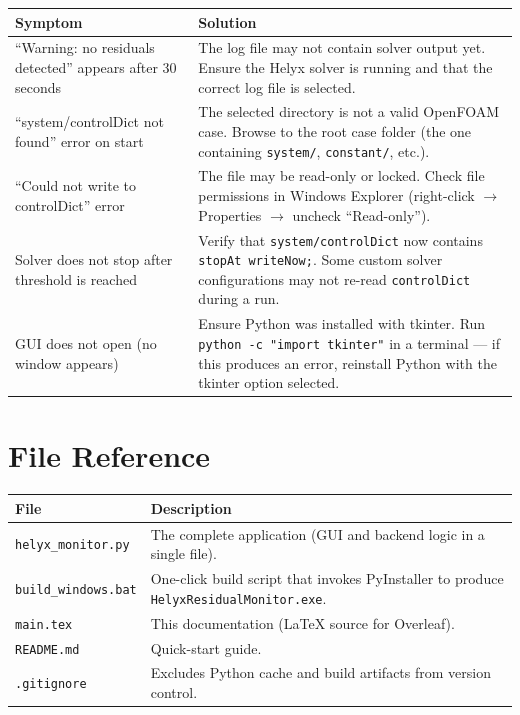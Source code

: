 \documentclass[12pt]{article}
\begin{document}
\begin{table}[h]
\centering
\begin{tabular}{@{}p{5.5cm}p{8.5cm}@{}}
\toprule
\textbf{Symptom} & \textbf{Solution} \\
\midrule
``Warning: no residuals detected'' appears after 30 seconds &
The log file may not contain solver output yet. Ensure the Helyx solver is running and that the correct log file is selected. \\
\addlinespace
``system/controlDict not found'' error on start &
The selected directory is not a valid OpenFOAM case. Browse to the root case folder (the one containing \texttt{system/}, \texttt{constant/}, etc.). \\
\addlinespace
``Could not write to controlDict'' error &
The file may be read-only or locked. Check file permissions in Windows Explorer (right-click $\to$ Properties $\to$ uncheck ``Read-only''). \\
\addlinespace
Solver does not stop after threshold is reached &
Verify that \texttt{system/controlDict} now contains \texttt{stopAt writeNow;}. Some custom solver configurations may not re-read \texttt{controlDict} during a run. \\
\addlinespace
GUI does not open (no window appears) &
Ensure Python was installed with tkinter. Run \texttt{python -c "import tkinter"} in a terminal --- if this produces an error, reinstall Python with the tkinter option selected. \\
\bottomrule
\end{tabular}
\end{table}

\section{File Reference}

\begin{table}[h]
\centering
\begin{tabular}{@{}lp{9cm}@{}}
\toprule
\textbf{File} & \textbf{Description} \\
\midrule
\texttt{helyx\_monitor.py} & The complete application (GUI and backend logic in a single file). \\
\texttt{build\_windows.bat} & One-click build script that invokes PyInstaller to produce \texttt{HelyxResidualMonitor.exe}. \\
\texttt{main.tex} & This documentation (LaTeX source for Overleaf). \\
\texttt{README.md} & Quick-start guide. \\
\texttt{.gitignore} & Excludes Python cache and build artifacts from version control. \\
\bottomrule
\end{tabular}
\end{table}
\end{document}
